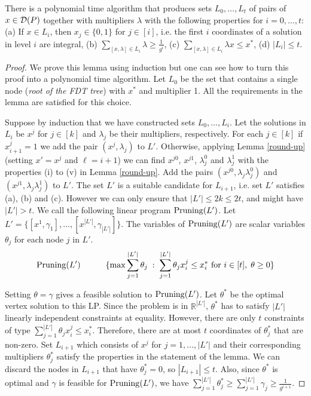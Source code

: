 \begin{lemma}\label{prune}
	There is a polynomial time algorithm that produces sets $L_0,\ldots,L_t$ of pairs of $x\in \operatorname{\mathcal{D}}(P)$ together with multipliers $\lambda$ with the following properties for $i=0,\ldots,t$:
	(a) If $x\in L_i$, then $x_j \in \{0,1\}$ for $j\in [i]$, i.e. the first $i$ coordinates of a solution in level $i$ are integral, (b) $\sum_{[x,\lambda]\in L_i} \lambda\geq\frac{1}{g^i}$, (c) $\sum_{[x,\lambda]\in L_i}\lambda x \leq x^*$, (d) $|L_i|\leq t$.
\end{lemma}
\begin{proof}
	We prove this lemma using induction but one can see how to turn this proof into a polynomial time algorithm. Let $L_0$ be the set that contains a single node (\textit{root of the FDT tree}) with $x^*$ and multiplier 1. All the requirements in the lemma are satisfied for this choice.
	
	Suppose by induction that we have constructed sets $L_0,\ldots,L_i$. Let the solutions in $L_i$ be $x^j$ for $j\in [k]$ and $\lambda_j$ be their multipliers, respectively. For each $j\in[k]$ if $x^j_{i+1}=1$ we add the pair $(x^j,\lambda_j)$ to $L'$. Otherwise,	applying Lemma \ref{round-up} (setting $x'= x^j$ and $\ell = i+1$) we can find $x^{j0}$, $x^{j1}$, $\lambda^0_j$ and $\lambda^1_j$ with the properties (i) to (v) in Lemma \ref{round-up}. Add the pairs  $(x^{j0} ,\lambda_j\lambda^0_j)$ and  $(x^{j1} ,\lambda_j\lambda^1_j)$ to $L'$. The set $L'$ is a suitable candidate for $L_{i+1}$, i.e. set $L'$ satisfies (a), (b) and (c). However we can only ensure that $|L'|\leq 2k\leq 2t$, and might have $|L'|>t$. We call the following linear program $\operatorname{{{Pruning}}}(L')$. Let $L' = \{[x^1,\gamma_1],\ldots,[x^{|L'|},\gamma_{|L'|}]\}$. The variables of $\operatorname{{{Pruning}}}(L')$ are scalar variables $\theta_j$ for each node $j$ in $L'$.  
		\begin{equation}
		\operatorname{{{Pruning}}}(L')\quad\quad\quad \{\max \sum_{j=1}^{|L'|} \theta_j\;:\; \sum_{j=1}^{|L'|} \theta_j x^j_i\leq x^*_i \mbox{ for $i\in [t]$},\; \theta\geq 0 \}
		\end{equation}
		
		Setting $\theta = \gamma$ gives a feasible solution to $\operatorname{{{Pruning}}}(L')$. Let $\theta^*$ be the optimal vertex solution to this LP. Since the problem is in $\mathbb{R}^{|L'|}$,  $\theta^*$ has to satisfy $|L'|$ linearly independent constraints at equality. However, there are only $t$ constraints of type $ \sum_{j=1}^{|L'|} \theta_j x^j_i\leq x^*_i$. Therefore, there are at most $t$ coordinates of $\theta^*_j$ that are non-zero. Set $L_{i+1}$ which consists of $x^j$ for $j=1,\ldots,|L'|$ and their corresponding multipliers $\theta^*_j$ satisfy the properties in the statement of the lemma. We can discard the nodes in $L_{i+1}$ that have $\theta^*_j=0$, so $|L_{i+1}| \leq t$. Also, since $\theta^*$ is optimal and $\gamma$ is feasible for $\operatorname{{{Pruning}}}(L')$, we have $\sum_{j=1}^{|L'|} \theta^*_j \geq \sum_{j=1}^{|L'|}\gamma_j \geq \frac{1}{g^{i+1}}$. \end{proof}
	
